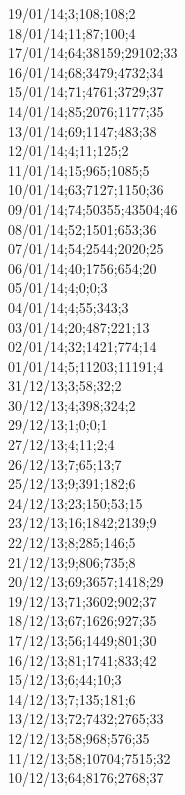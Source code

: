 19/01/14;3;108;108;2 \\
18/01/14;11;87;100;4 \\
17/01/14;64;38159;29102;33 \\
16/01/14;68;3479;4732;34 \\
15/01/14;71;4761;3729;37 \\
14/01/14;85;2076;1177;35 \\
13/01/14;69;1147;483;38 \\
12/01/14;4;11;125;2 \\
11/01/14;15;965;1085;5 \\
10/01/14;63;7127;1150;36 \\
09/01/14;74;50355;43504;46 \\
08/01/14;52;1501;653;36 \\
07/01/14;54;2544;2020;25 \\
06/01/14;40;1756;654;20 \\
05/01/14;4;0;0;3 \\
04/01/14;4;55;343;3 \\
03/01/14;20;487;221;13 \\
02/01/14;32;1421;774;14 \\
01/01/14;5;11203;11191;4 \\
31/12/13;3;58;32;2 \\
30/12/13;4;398;324;2 \\
29/12/13;1;0;0;1 \\
27/12/13;4;11;2;4 \\
26/12/13;7;65;13;7 \\
25/12/13;9;391;182;6 \\
24/12/13;23;150;53;15 \\
23/12/13;16;1842;2139;9 \\
22/12/13;8;285;146;5 \\
21/12/13;9;806;735;8 \\
20/12/13;69;3657;1418;29 \\
19/12/13;71;3602;902;37 \\
18/12/13;67;1626;927;35 \\
17/12/13;56;1449;801;30 \\
16/12/13;81;1741;833;42 \\
15/12/13;6;44;10;3 \\
14/12/13;7;135;181;6 \\
13/12/13;72;7432;2765;33 \\
12/12/13;58;968;576;35 \\
11/12/13;58;10704;7515;32 \\
10/12/13;64;8176;2768;37 \\
